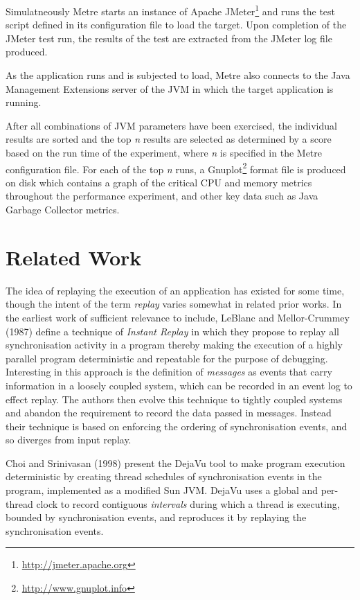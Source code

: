 \documentclass[]{final_report}
\begin{document}
Simulatneously Metre starts an instance of Apache JMeter\footnote{\url{http://jmeter.apache.org}} and runs the test script defined in its configuration file to load the target. Upon completion of the JMeter test run, the results of the test are extracted from the JMeter log file produced.

As the application runs and is subjected to load, Metre also connects to the Java Management Extensions server of the JVM in which the target application is running.

After all combinations of JVM parameters have been exercised, the individual results are sorted and the top \textit{n} results are selected as determined by a score based on the run time of the experiment, where \textit{n} is specified in the Metre configuration file. For each of the top \textit{n} runs, a Gnuplot\footnote{\url{http://www.gnuplot.info}} format file is produced on disk which contains a graph of the critical CPU and memory metrics throughout the performance experiment, and other key data such as Java Garbage Collector metrics.

\chapter{Related Work \label{related_work}}
The idea of replaying the execution of an application has existed for some time, though the intent of the term \textit{replay} varies somewhat in related prior works. In the earliest work of sufficient relevance to include, LeBlanc and Mellor-Crummey (1987) \cite{leblanc:1987} define a technique of \textit{Instant Replay} in which they propose to replay all synchronisation activity in a program thereby making the execution of a highly parallel program deterministic and repeatable for the purpose of debugging. Interesting in this approach is the definition of \textit{messages} as events that carry information in a loosely coupled system, which can be recorded in an event log to effect replay. The authors then evolve this technique to tightly coupled systems and abandon the requirement to record the data passed in messages. Instead their technique is based on enforcing the ordering of synchronisation events, and so diverges from input replay.

Choi and Srinivasan (1998)\cite{choi:1998} present the DejaVu tool to make program execution deterministic by creating thread schedules of synchronisation events in the program, implemented as a modified Sun JVM. DejaVu uses a global and per-thread clock to record contiguous \textit{intervals} during which a thread is executing, bounded by synchronisation events, and reproduces it by replaying the synchronisation events.
\end{document}
